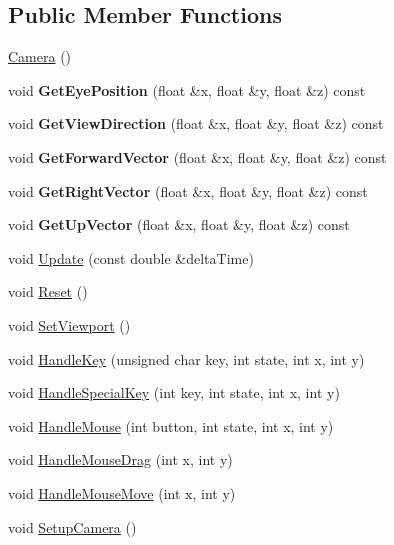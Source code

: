 \subsection*{Public Member Functions}
\begin{DoxyCompactItemize}
\item 
\hyperlink{class_camera_a01f94c3543f56ede7af49dc778f19331}{Camera} ()
\item 
void {\bfseries Get\+Eye\+Position} (float \&x, float \&y, float \&z) const \hypertarget{class_camera_a77db484a2cd90ea89a4c42e2ddb50bb9}{}\label{class_camera_a77db484a2cd90ea89a4c42e2ddb50bb9}

\item 
void {\bfseries Get\+View\+Direction} (float \&x, float \&y, float \&z) const \hypertarget{class_camera_a2fb58e261783be389e8f31d72f0e519c}{}\label{class_camera_a2fb58e261783be389e8f31d72f0e519c}

\item 
void {\bfseries Get\+Forward\+Vector} (float \&x, float \&y, float \&z) const \hypertarget{class_camera_a87bb6f576b91e92ae7ab0b40a8b637d0}{}\label{class_camera_a87bb6f576b91e92ae7ab0b40a8b637d0}

\item 
void {\bfseries Get\+Right\+Vector} (float \&x, float \&y, float \&z) const \hypertarget{class_camera_a064623026c61013747babd237b1e4ffb}{}\label{class_camera_a064623026c61013747babd237b1e4ffb}

\item 
void {\bfseries Get\+Up\+Vector} (float \&x, float \&y, float \&z) const \hypertarget{class_camera_ad89f7bc75d6f87de02a252d269d5ba17}{}\label{class_camera_ad89f7bc75d6f87de02a252d269d5ba17}

\item 
void \hyperlink{class_camera_a4502b36b87b9f058bfad2c4716c00c1e}{Update} (const double \&delta\+Time)
\item 
void \hyperlink{class_camera_aa46f58b32270a571ab56dde4caca46db}{Reset} ()
\item 
void \hyperlink{class_camera_a2fea95f244577af436294a9b2c1fd1cc}{Set\+Viewport} ()
\item 
void \hyperlink{class_camera_aafed3cc6d06082a7396c38f4dd4a0549}{Handle\+Key} (unsigned char key, int state, int x, int y)
\item 
void \hyperlink{class_camera_aefce3308a5ed57fbc6666d8935fb7eac}{Handle\+Special\+Key} (int key, int state, int x, int y)
\item 
void \hyperlink{class_camera_adf8b8e5f8f1e88a373f102b3efa12697}{Handle\+Mouse} (int button, int state, int x, int y)
\item 
void \hyperlink{class_camera_af0b7923173a70a13f108ac69a8d9b848}{Handle\+Mouse\+Drag} (int x, int y)
\item 
void \hyperlink{class_camera_a47357f68951777da13bef3234ff7474e}{Handle\+Mouse\+Move} (int x, int y)
\item 
void \hyperlink{class_camera_a62032d7798b96031f332e20e7c8b1794}{Setup\+Camera} ()
\end{DoxyCompactItemize}


